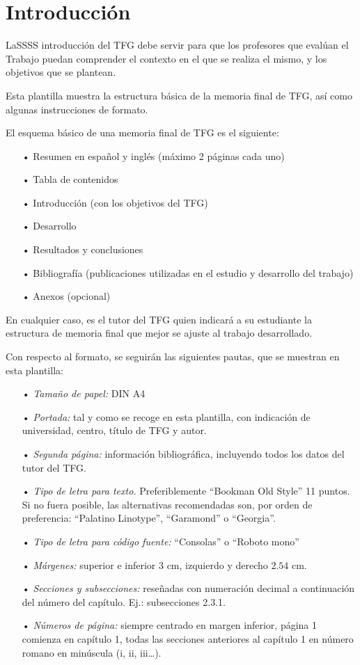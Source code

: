 \chapter{Introducción}
LaSSSS introducción del TFG debe servir para que los profesores que evalúan el Trabajo puedan comprender el contexto en el que se realiza el mismo, y los objetivos que se plantean.

Esta plantilla muestra la estructura básica de la memoria final de TFG, así como algunas instrucciones de formato.

El esquema básico de una memoria final de TFG es el siguiente:
\begin{itemize}
\item[•] Resumen en español y inglés (máximo 2 páginas cada uno)
\item[•] Tabla de contenidos
\item[•] Introducción (con los objetivos del TFG)
\item[•] Desarrollo
\item[•] Resultados y conclusiones
\item[•] Bibliografía (publicaciones utilizadas en el estudio y desarrollo del trabajo)
\item[•] Anexos (opcional)
\end{itemize}

En cualquier caso, es el tutor del TFG quien indicará a su estudiante la estructura de memoria final que mejor se ajuste al trabajo desarrollado.

Con respecto al formato, se seguirán las siguientes pautas, que se muestran en esta plantilla:
\begin{itemize}
\item[•] \textit{Tamaño de papel:} DIN A4
\item[•] \textit{Portada:} tal y como se recoge en esta plantilla, con indicación de universidad, centro, título de TFG y autor.
\item[•] \textit{Segunda página:} información bibliográfica, incluyendo todos los datos del tutor del TFG.
\item[•] \textit{Tipo de letra para texto.} Preferiblemente “Bookman Old Style” 11 puntos. Si no fuera posible, las alternativas recomendadas son, por orden de preferencia: “Palatino Linotype”, “Garamond” o “Georgia”.
\item[•] \textit{Tipo de letra para código fuente:} “Consolas” o “Roboto mono”
\item[•] \textit{Márgenes:} superior e inferior $3$ cm, izquierdo y derecho $2.54$ cm.
\item[•] \textit{Secciones y subsecciones:} reseñadas con numeración decimal a continuación del número del capítulo. Ej.: subsecciones 2.3.1.
\item[•] \textit{Números de página:} siempre centrado en margen inferior, página 1 comienza en capítulo 1, todas las secciones anteriores al capítulo 1 en número romano en minúscula (i, ii, iii…).
\end{itemize}

